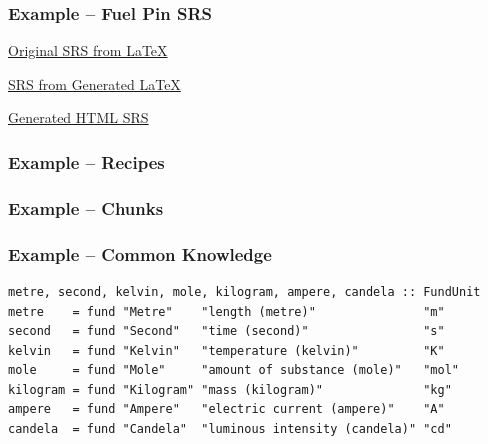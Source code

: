 \documentclass{beamer}
\begin{document}

\begin{frame}[fragile]
\frametitle{Example -- Fuel Pin SRS}

\href{run:SRS.pdf}{Original SRS from \LaTeX{}}

\href{run:gen_SRS.pdf}{SRS from Generated \LaTeX{}}

\href{run:gen_SRS.html}{Generated HTML SRS}

\end{frame}


\begin{frame}[fragile]
\frametitle{Example -- Recipes}



\end{frame}

\begin{frame}[fragile]
\frametitle{Example -- Chunks}



\end{frame}


\begin{frame}[fragile]
\frametitle{Example -- Common Knowledge}

\begin{lstlisting}[frame=single,showstringspaces=false, basicstyle=\tiny]
metre, second, kelvin, mole, kilogram, ampere, candela :: FundUnit
metre    = fund "Metre"    "length (metre)"               "m"
second   = fund "Second"   "time (second)"                "s"
kelvin   = fund "Kelvin"   "temperature (kelvin)"         "K"
mole     = fund "Mole"     "amount of substance (mole)"   "mol"
kilogram = fund "Kilogram" "mass (kilogram)"              "kg"
ampere   = fund "Ampere"   "electric current (ampere)"    "A"
candela  = fund "Candela"  "luminous intensity (candela)" "cd"
\end{lstlisting}

\end{frame}

\end{document}
